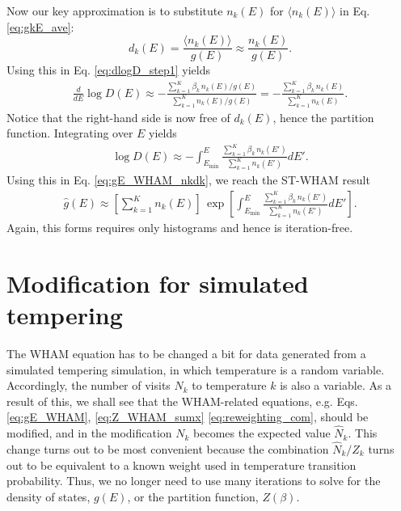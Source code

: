\documentclass[aip,jcp,preprint,superscriptaddress]{revtex4-1}
\begin{document}
Now our key approximation
is to substitute $n_k(E)$ for $\langle n_k(E) \rangle$
in Eq. \eqref{eq:gkE_ave}:
%
\begin{equation}
  d_k(E)
  =
  \frac{ \langle n_k(E) \rangle } { g(E) }
  \approx
  \frac{ n_k(E) } { g(E) }.
  \label{eq:dkE_approx}
\end{equation}
%
Using this in Eq. \eqref{eq:dlogD_step1} yields
%
\begin{align*}
\frac{d}{dE} \log D(E)
\approx
-\frac{ \sum_{k = 1}^K \beta_k \, n_k(E) / g(E) }
{ \sum_{k = 1}^K n_k(E) / g(E) }
=
-\frac{ \sum_{k = 1}^K \beta_k \, n_k(E) }
{ \sum_{k = 1}^K n_k(E) }.
\end{align*}
%
Notice that the right-hand side
is now free of $d_k(E)$, hence the partition function.
%
Integrating over $E$ yields
%
\begin{align*}
\log D(E)
\approx
-\int^E_{E_{\min}} \frac{ \sum_{k = 1}^K \beta_k \, n_k(E') }
{ \sum_{k = 1}^K n_k(E') } dE'.
\end{align*}
%
Using this in Eq. \eqref{eq:gE_WHAM_nkdk},
we reach the ST-WHAM result
\begin{align}
\hat g(E)
\approx
\left[
  \sum_{k = 1}^K n_k(E)
\right]
\,
\exp
\left[
\int^E_{E_{\min}}
    \frac{ \sum_{k = 1}^K \beta_k \, n_k(E') }
         { \sum_{k = 1}^K n_k(E') }
  dE'
\right].
\label{eq:g_STWHAM}
\end{align}
%
Again, this forms requires
only histograms
and hence is iteration-free.






\section{\label{sec:simultemp}
Modification for simulated tempering}



The WHAM equation has to be changed a bit
for data generated from
a simulated tempering simulation\cite{
marinari1992, lyubartsev1992},
in which temperature is a random variable.
%
Accordingly,
the number of visits $N_k$ to temperature $k$
is also a variable.
%
As a result of this,
we shall see that
the WHAM-related equations,
e.g. Eqs. \eqref{eq:gE_WHAM},
\eqref{eq:Z_WHAM_sumx}
\eqref{eq:reweighting_com},
should be modified,
and in the modification
$N_k$ becomes the expected value $\hat N_k$.
%
This change turns out to be most convenient
because the combination $\hat N_k/Z_k$
turns out to be equivalent to a known weight
used in temperature transition probability.
%
Thus, we no longer need to use many iterations
to solve for the density of states,
$g(E)$, or the partition function, $Z(\beta)$.
\end{document}

